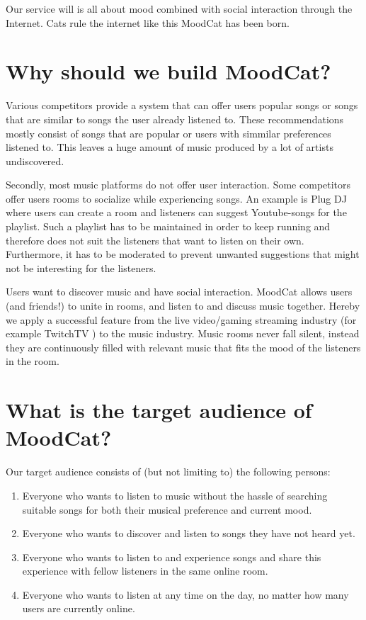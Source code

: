 \documentclass[10pt,a4paper]{article}
\begin{document}
Our service will is all about mood combined with social interaction through the Internet. Cats rule the internet like this MoodCat has been born.

\section{Why should we build MoodCat?}
Various competitors provide a system that can offer users popular songs or songs that are similar to songs the user already listened to.
These recommendations mostly consist of songs that are popular or users with simmilar preferences listened to.
This leaves a huge amount of music produced by a lot of artists undiscovered.

Secondly, most music platforms do not offer user interaction.
Some competitors offer users rooms to socialize while experiencing songs.
An example is Plug DJ \cite{PlugDJ} where users can create a room and listeners can suggest Youtube-songs\cite{Youtube} for the playlist.
Such a playlist has to be maintained in order to keep running and therefore does not suit the listeners that want to listen on their own.
Furthermore, it has to be moderated to prevent unwanted suggestions that might not be interesting for the listeners.

\bigskip 

Users want to discover music and have social interaction.
MoodCat allows users (and friends!) to unite in rooms, and listen to and discuss music together.
Hereby we apply a successful feature from the live video/gaming streaming industry (for example TwitchTV \cite{Twitch}) to the music industry.
Music rooms never fall silent, instead they are continuously filled with relevant music that fits the mood of the listeners in the room.

\section{What is the target audience of MoodCat?}
Our target audience consists of (but not limiting to) the following persons:

\begin{enumerate}
\item Everyone who wants to listen to music without the hassle of searching suitable songs for both their musical preference and current mood.

\item Everyone who wants to discover and listen to songs they have not heard yet.

\item Everyone who wants to listen to and experience songs and share this experience with fellow listeners in the same online room.

\item Everyone who wants to listen at any time on the day, no matter how many users are currently online.
\end{enumerate}
\end{document}
